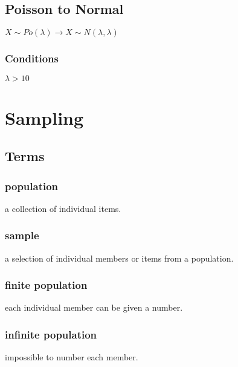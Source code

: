 \documentclass[a4paper,9pt]{scrartcl}
\begin{document}
    \subsection{Poisson to Normal}

    \begin{math}
        X {\sim} Po(\lambda) \longrightarrow X {\sim} N(\lambda, \lambda)
    \end{math}

    \subsubsection{Conditions}

    \begin{math}
        \lambda > 10
    \end{math}


    \section{Sampling}

    \subsection{Terms}

    \subsubsection{population}

    a collection of individual items.

    \subsubsection{sample}

    a selection of individual members or items from a population.

    \subsubsection{finite population}

    each individual member can be given a number.

    \subsubsection{infinite population}

    impossible to number each member.
\end{document}
